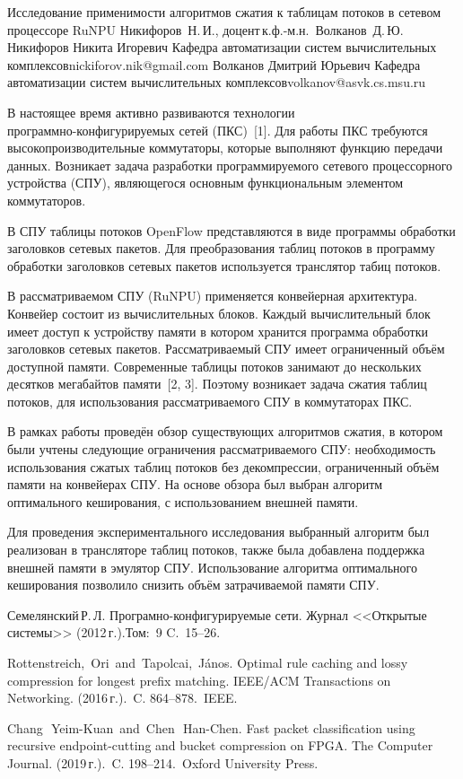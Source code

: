 \begin{lmrarticle}
{Исследование применимости алгоритмов сжатия к таблицам потоков в сетевом процессоре RuNPU}
    {Никифоров~Н.\,И., доцент\,к.ф.-м.н.~Волканов~Д.\,Ю.}
\TwoAuthor%
{Никифоров Никита Игоревич}
    {Кафедра автоматизации систем вычислительных комплексов}{nickiforov.nik@gmail.com}
{Волканов Дмитрий Юрьевич}
    {Кафедра автоматизации систем вычислительных комплексов}{volkanov@asvk.cs.msu.ru}

    В настоящее время активно развиваются технологии\\ программно-конфигурируемых сетей (ПКС)~[1]. Для работы ПКС требуются высокопроизводительные коммутаторы, 
которые выполняют функцию передачи данных. Возникает задача разработки программируемого сетевого процессорного устройства (СПУ),
являющегося основным функциональным элементом коммутаторов.

В СПУ таблицы потоков OpenFlow представляются в виде программы обработки заголовков сетевых пакетов.
Для преобразования таблиц потоков в программу обработки заголовков сетевых пакетов используется транслятор табиц потоков.

В рассматриваемом СПУ (RuNPU) применяется конвейерная архитектура. Конвейер состоит из вычислительных блоков. Каждый вычислительный блок имеет доступ к 
устройству памяти в котором хранится программа обработки заголовков сетевых пакетов. Рассматриваемый СПУ имеет ограниченный объём доступной памяти. Современные таблицы потоков занимают до нескольких десятков мегабайтов памяти~[2, 3]. Поэтому возникает задача сжатия таблиц потоков,
для использования рассматриваемого СПУ в коммутаторах ПКС.

В рамках работы проведён обзор существующих алгоритмов сжатия, в котором были учтены следующие ограничения рассматриваемого СПУ:
необходимость использования сжатых таблиц потоков без декомпрессии, ограниченный объём памяти на конвейерах СПУ. На основе обзора был выбран алгоритм оптимального кеширования, с использованием внешней памяти.

Для проведения экспериментального исследования выбранный алгоритм был реализован в трансляторе таблиц потоков, также была добавлена поддержка внешней памяти в 
эмулятор СПУ. Использование алгоритма оптимального кеширования позволило снизить объём затрачиваемой памяти СПУ.\\
\begin{lmrreferences}
\item
Семелянский\,Р.\,Л. Програмно-конфигурируемые сети.
Журнал <<Открытые системы>>
(2012\,г.).Том:~9 C.\, 15--26.
\item
Rottenstreich,~Ori~and~Tapolcai,~J{\'a}nos.
Optimal rule caching and lossy compression for longest prefix matching.
IEEE/ACM Transactions on Networking.
(2016\,г.).~C. 864--878.~IEEE.
\item
Chang\,~Yeim-Kuan~and~Chen\,~Han-Chen.
Fast packet classification using recursive endpoint-cutting and bucket compression on FPGA.
The Computer Journal.
    (2019\,г.).~C. 198--214.~Oxford University Press.
\end{lmrreferences}
\end{lmrarticle}
